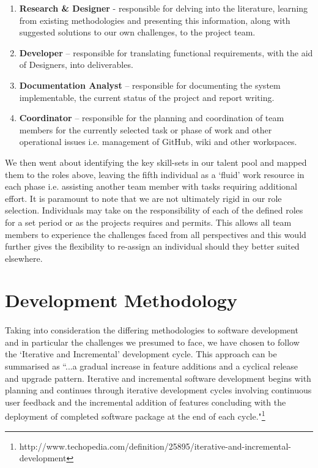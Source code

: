 \documentclass[11pt,a4paper]{article}
\begin{document}
\begin{enumerate}
  \item \textbf{Research \& Designer} - responsible for delving into the literature, learning from existing methodologies and presenting this information, along with suggested solutions to our own challenges, to the project team.
  \item \textbf{Developer} – responsible for translating functional requirements, with the aid of Designers, into deliverables.
  \item \textbf{Documentation Analyst} – responsible for documenting the system implementable, the current status of the project and report writing.
  \item \textbf{Coordinator} – responsible for the planning and coordination of team members for the currently selected task or phase of work and other operational issues i.e. management of GitHub, wiki and other workspaces.
\end{enumerate}

We then went about identifying the key skill-sets in our talent pool and mapped them to the roles above, leaving the fifth individual as a ‘fluid’ work resource in each phase i.e. assisting another team member with tasks requiring additional effort.  It is paramount to note that we are not ultimately rigid in our role selection.  Individuals may take on the responsibility of each of the defined roles for a set period or as the projects requires and permits.  This allows all team members to experience the challenges faced from all perspectives and this would further gives the flexibility to re-assign an individual should they better suited elsewhere.

\section{Development Methodology}
\paragraph{}
Taking into consideration the differing methodologies to software development and in particular the challenges we presumed to face, we have chosen to follow the ‘Iterative and Incremental’ development cycle.  This approach can be summarised as “...a gradual increase in feature additions and a cyclical release and upgrade pattern.
Iterative and incremental software development begins with planning and continues through iterative development cycles involving continuous user feedback and the incremental addition of features concluding with the deployment of completed software package at the end of each cycle."\footnote{http://www.techopedia.com/definition/25895/iterative-and-incremental-development}
\end{document}
